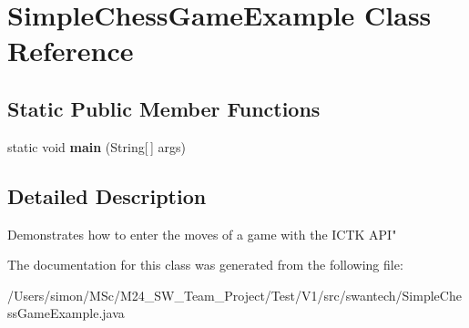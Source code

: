 \hypertarget{class_simple_chess_game_example}{}\section{Simple\+Chess\+Game\+Example Class Reference}
\label{class_simple_chess_game_example}
\subsection*{Static Public Member Functions}
\begin{DoxyCompactItemize}
\item 
\hypertarget{class_simple_chess_game_example_a23114ea8de46ecd3b51ab5ec33b007e9}{}static void {\bfseries main} (String\mbox{[}$\,$\mbox{]} args)\label{class_simple_chess_game_example_a23114ea8de46ecd3b51ab5ec33b007e9}

\end{DoxyCompactItemize}


\subsection{Detailed Description}
Demonstrates how to enter the moves of a game with the I\+C\+T\+K A\+P\+I" 

The documentation for this class was generated from the following file\+:\begin{DoxyCompactItemize}
\item 
/\+Users/simon/\+M\+Sc/\+M24\+\_\+\+S\+W\+\_\+\+Team\+\_\+\+Project/\+Test/\+V1/src/swantech/Simple\+Chess\+Game\+Example.\+java\end{DoxyCompactItemize}
